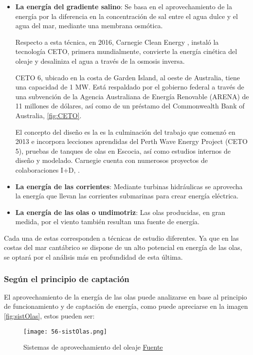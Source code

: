 \begin{itemize}
\item
  \textbf{La energía del gradiente salino}: Se basa en el
  aprovechamiento de la energía por la diferencia en la concentración de
  sal entre el agua dulce y el agua del mar, mediante una membrana
  osmótica.

  Respecto a esta técnica, en 2016,
  Carnegie Clean Energy \cite{ceto},
  instaló la tecnología CETO, primera mundialmente, convierte la energía
  cinética del oleaje y desaliniza el agua a través de la osmosis
  inversa.

  CETO 6, ubicado en la costa de Garden Island, al oeste de Australia, tiene
  una capacidad de 1 MW. Está respaldado por el gobierno federal a
  través de una subvención de la Agencia Australiana de Energía
  Renovable (ARENA) de 11 millones de dólares, así como de un préstamo
  del Commonwealth Bank of Australia, \autoref{fig:CETO}.

  El concepto del diseño es la es la culminación del trabajo que comenzó
  en 2013 e incorpora lecciones aprendidas del Perth Wave Energy Project
  (CETO 5), pruebas de tanques de olas en Escocia, así como estudios
  internos de diseño y modelado. Carnegie cuenta con numerosos proyectos
  de colaboraciones I+D, \cite{carnegie}.
  
\item
  \textbf{La energía de las corrientes}: Mediante turbinas hidráulicas
  se aprovecha la energía que llevan las corrientes submarinas para
  crear energía eléctrica.
\item
  \textbf{La energía de las olas o undimotriz}: Las olas producidas, en
  gran medida, por el viento también resultan una fuente de energía.
\end{itemize}

Cada una de estas corresponden a técnicas de estudio diferentes. Ya que
en las costas del mar cantábrico se dispone de un alto potencial en
energía de las olas, se optará por el análisis más en profundidad de
esta última.

\subsubsection{Según el principio de captación}\label{header-n85}

El aprovechamiento de la energía de las olas puede analizarse en base al
principio de funcionamiento y de captación de energía, como puede apreciarse en la imagen  \autoref{fig:sistOlas}, estos pueden ser:

\begin{figure}
  \centering
  \texttt{[image: 56-sistOlas.png]}
  \caption[Sistemas de aprovechamiento del oleaje]{Sistemas de aprovechamiento del oleaje \href{www.aquaret.com}{Fuente}}
  \label{fig:sistOlas}
\end{figure}

